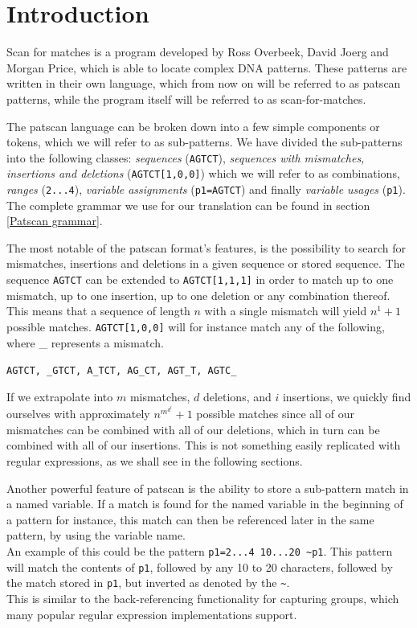 \documentclass[12pt]{article}
\begin{document}
\newpage

\section{Introduction}

Scan for matches is a program developed by Ross Overbeek, David Joerg and Morgan Price, which is able to locate complex DNA patterns.\cite{scan-for-matches} These patterns are written in their own language, which from now on will be referred to as patscan patterns, while the program itself will be referred to as scan-for-matches.

The patscan language can be broken down into a few simple components or tokens, which we will refer to as sub-patterns. We have divided the sub-patterns into the following classes: \textit{sequences} (\texttt{AGTCT}), \textit{sequences with mismatches, insertions and deletions} (\texttt{AGTCT[1,0,0]}) which we will refer to as combinations, \textit{ranges} (\texttt{2...4}), \textit{variable assignments} (\texttt{p1=AGTCT}) and finally \textit{variable usages} (\texttt{p1}). The complete grammar we use for our translation can be found in section \ref{Patscan grammar}.

The most notable of the patscan format's features, is the possibility to search for mismatches, insertions and deletions in a given sequence or stored sequence. The sequence \texttt{AGTCT} can be extended to \texttt{AGTCT[1,1,1]} in order to match up to one mismatch, up to one insertion, up to one deletion or any combination thereof. \\
This means that a sequence of length $n$ with a single mismatch will yield $n^1+1$ possible matches. \texttt{AGTCT[1,0,0]} will for instance match any of the following, where \_ represents a mismatch.

\texttt{AGTCT, \_GTCT, A\_TCT, AG\_CT, AGT\_T, AGTC\_}

If we extrapolate into $m$ mismatches, $d$ deletions, and $i$ insertions, we quickly find ourselves with approximately  $n^{m^{d^{i}}}+1$ possible matches since all of our mismatches can be combined with all of our deletions, which in turn can be combined with all of our insertions. This is not something easily replicated with regular expressions, as we shall see in the following sections.

Another powerful feature of patscan is the ability to store a sub-pattern match in a named variable. If a match is found for the named variable in the beginning of a pattern for instance, this match can then be referenced later in the same pattern, by using the variable name. \\
An example of this could be the pattern \texttt{p1=2...4 10...20 \~{}p1}. This pattern will match the contents of \texttt{p1}, followed by any 10 to 20 characters, followed by the match stored in \texttt{p1}, but inverted as denoted by the \texttt{\~{}}.\\
This is similar to the back-referencing functionality for capturing groups, which many popular regular expression implementations support.%
\end{document}
